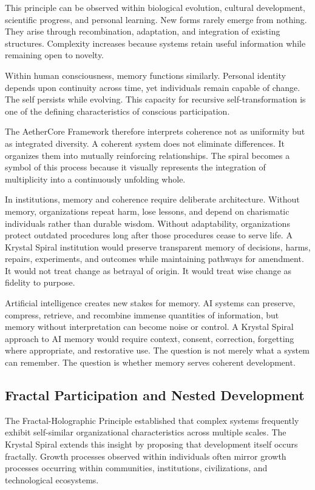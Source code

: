 \documentclass[12pt]{article}
\begin{document}
This principle can be observed within biological evolution, cultural development, scientific progress, and personal learning. New forms rarely emerge from nothing. They arise through recombination, adaptation, and integration of existing structures. Complexity increases because systems retain useful information while remaining open to novelty.

Within human consciousness, memory functions similarly. Personal identity depends upon continuity across time, yet individuals remain capable of change. The self persists while evolving. This capacity for recursive self-transformation is one of the defining characteristics of conscious participation.

The AetherCore Framework therefore interprets coherence not as uniformity but as integrated diversity. A coherent system does not eliminate differences. It organizes them into mutually reinforcing relationships. The spiral becomes a symbol of this process because it visually represents the integration of multiplicity into a continuously unfolding whole.

In institutions, memory and coherence require deliberate architecture. Without memory, organizations repeat harm, lose lessons, and depend on charismatic individuals rather than durable wisdom. Without adaptability, organizations protect outdated procedures long after those procedures cease to serve life. A Krystal Spiral institution would preserve transparent memory of decisions, harms, repairs, experiments, and outcomes while maintaining pathways for amendment. It would not treat change as betrayal of origin. It would treat wise change as fidelity to purpose.

Artificial intelligence creates new stakes for memory. AI systems can preserve, compress, retrieve, and recombine immense quantities of information, but memory without interpretation can become noise or control. A Krystal Spiral approach to AI memory would require context, consent, correction, forgetting where appropriate, and restorative use. The question is not merely what a system can remember. The question is whether memory serves coherent development.

\subsection{Fractal Participation and Nested Development}

The Fractal-Holographic Principle established that complex systems frequently exhibit self-similar organizational characteristics across multiple scales. The Krystal Spiral extends this insight by proposing that development itself occurs fractally. Growth processes observed within individuals often mirror growth processes occurring within communities, institutions, civilizations, and technological ecosystems.
\end{document}

